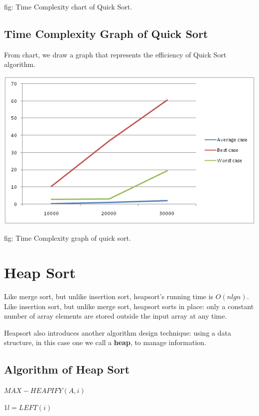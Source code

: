 \documentclass[9 pt]{report}
\begin{document}
\hspace{5cm}fig: Time Complexity chart of Quick Sort.

\subsection{\huge Time Complexity Graph of Quick Sort}

From chart, we draw a graph that represents the efficiency of Quick Sort algorithm.

\vspace{1cm}

\includegraphics{quicksort.png}

\hspace{5cm}fig: Time Complexity graph of quick sort.

\section{\huge Heap Sort}

Like merge sort, but unlike insertion sort, heapsort's running time is $O(n lgn)$. Like insertion sort, but unlike merge sort, heapsort sorts in place: only a constant number of array elements are stored outside the input array at any time. 

Heapsort also introduces another algorithm design technique: using a data structure, in this case one we call a \textbf{heap}, to manage information. 

\subsection{\huge Algorithm of Heap Sort}


$MAX-HEAPIFY(A,i)$

1\hspace{0.5cm}$l=LEFT(i)$
\end{document}
